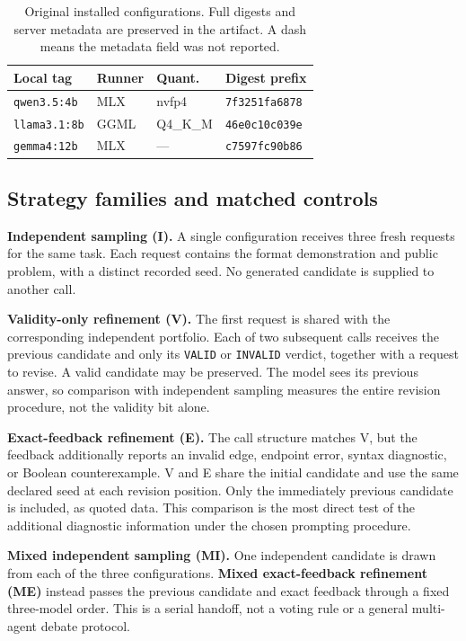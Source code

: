 \begin{table}[t]
\caption{Original installed configurations. Full digests and server metadata are preserved in the artifact. A dash means the metadata field was not reported.}
\label{tab:models}
\centering\small
\begin{tabular}{llll}
\toprule
Local tag & Runner & Quant. & Digest prefix\\
\midrule
\texttt{qwen3.5:4b} & MLX & nvfp4 & \texttt{7f3251fa6878}\\
\texttt{llama3.1:8b} & GGML & Q4\_K\_M & \texttt{46e0c10c039e}\\
\texttt{gemma4:12b} & MLX & --- & \texttt{c7597fc90b86}\\
\bottomrule
\end{tabular}
\end{table}

\subsection{Strategy families and matched controls}

\textbf{Independent sampling (I).} A single configuration receives three fresh requests for the same task. Each request contains the format demonstration and public problem, with a distinct recorded seed. No generated candidate is supplied to another call.

\textbf{Validity-only refinement (V).} The first request is shared with the corresponding independent portfolio. Each of two subsequent calls receives the previous candidate and only its \texttt{VALID} or \texttt{INVALID} verdict, together with a request to revise. A valid candidate may be preserved. The model sees its previous answer, so comparison with independent sampling measures the entire revision procedure, not the validity bit alone.

\textbf{Exact-feedback refinement (E).} The call structure matches V, but the feedback additionally reports an invalid edge, endpoint error, syntax diagnostic, or Boolean counterexample. V and E share the initial candidate and use the same declared seed at each revision position. Only the immediately previous candidate is included, as quoted data. This comparison is the most direct test of the additional diagnostic information under the chosen prompting procedure.

\textbf{Mixed independent sampling (MI).} One independent candidate is drawn from each of the three configurations. \textbf{Mixed exact-feedback refinement (ME)} instead passes the previous candidate and exact feedback through a fixed three-model order. This is a serial handoff, not a voting rule or a general multi-agent debate protocol.

